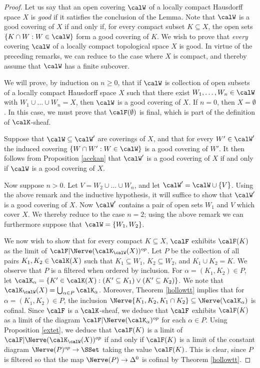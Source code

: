 \begin{proof}
Let us say that an open covering $\calW$ of a locally compact Hausdorff space $X$ is {\it good} if it satisfies the conclusion of the Lemma. 
Note that $\calW$ is a good covering of $X$ if and only if, for every compact subset $K \subseteq X$, the open sets $\{ K \cap W: W \in \calW \}$ 
form a good covering of $K$. We wish to prove that {\em every} covering $\calW$ of a locally compact topological space $X$ is good. In virtue of the preceding remarks, we can reduce to the case where $X$ is compact, and thereby assume that $\calW$ has a finite subcover.

We will prove, by induction on $n \geq 0$, that if $\calW$ is collection of open subsets of a locally compact Hausdorff space $X$ such that there exist $W_1, \ldots, W_n \in \calW$ with
$W_1 \cup \ldots \cup W_n = X$, then $\calW$ is a good covering of $X$. If $n = 0$, then
$X = \emptyset$. In this case, we must prove that $\calF(\emptyset)$ is final, which is part of the definition of $\calK$-sheaf.

Suppose that $\calW \subseteq \calW'$ are coverings of $X$, and that for every $W' \in \calW'$ the induced covering $\{ W \cap W': W \in \calW \}$ is a good covering of $W'$. It then follows from Proposition \ref{acekan} that $\calW'$ is a good covering of $X$ if and only if $\calW$ is a good covering of $X$.

Now suppose $n > 0$. Let $V = W_2 \cup \ldots \cup W_n$, and let $\calW' = \calW \cup \{V\}$. Using the above remark and the inductive hypothesis, it will suffice to show that $\calW'$ is a good covering of $X$. Now $\calW'$ contains a pair of open sets $W_1$ and $V$ which cover $X$. We thereby reduce to the case $n=2$; using the above remark we can furthermore suppose that
$\calW = \{ W_1, W_2 \}$. 

We now wish to show that for every compact $K \subseteq X$, $\calF$ exhibits
$\calF(K)$ as the limit of $\calF | \Nerve(\calK_{\calW}(X))^{op}$. Let $P$ be the collection
of all pairs $K_1, K_2 \in \calK(X)$ such that $K_1 \subseteq W_1$, $K_2 \subseteq W_2$, and $K_1 \cup K_2 = K$. We observe that $P$ is a filtered when ordered by inclusion.
For $\alpha = (K_1, K_2) \in P$, let $\calK_{\alpha} = \{ K' \in \calK(X): (K' \subseteq K_1) \vee (K' \subseteq K_2) \}$. We note that $\calK_{\calW}(X) = \bigcup_{\alpha \in P} \calK_{\alpha}$.
Moreover, Theorem \ref{hollowtt} implies that for $\alpha = (K_1, K_2) \in P$, the inclusion
$ \Nerve \{ K_1, K_2, K_1 \cap K_2 \} \subseteq \Nerve(\calK_{\alpha})$ is cofinal.
Since $\calF$ is a $\calK$-sheaf, we deduce that $\calF$ exhibits
$\calF(K)$ as a limit of the diagram $\calF | \Nerve(\calK_{\alpha})^{op}$ for each
$\alpha \in P$. Using Proposition \ref{extet}, we deduce that $\calF(K)$ is a limit of
$\calF | \Nerve(\calK_{\calW}(X))^{op}$ if and only if $\calF(K)$ is a limit of the constant
diagram $\Nerve(P)^{op} \rightarrow \SSet$ taking the value $\calF(K)$. This is clear, since
$P$ is filtered so that the map $\Nerve(P) \rightarrow \Delta^0$ is cofinal by Theorem \ref{hollowtt}.
\end{proof}

